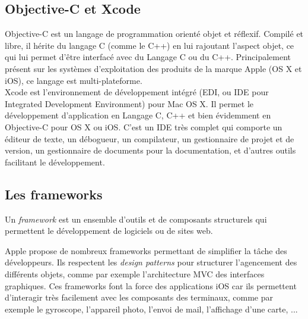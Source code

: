 
\subsection{Objective-C et Xcode}

Objective-C est un langage de programmation orienté objet et réflexif.
Compilé et libre, il hérite du langage C (comme le C++) en lui rajoutant l'aspect objet, ce qui lui permet d'être interfacé avec du Langage C ou du C++.
Principalement présent sur les systèmes d'exploitation des produits de la marque Apple (OS X et iOS), ce langage est multi-plateforme.
\\


Xcode est l'environnement de développement intégré (EDI, ou IDE pour Integrated Development Environment) pour Mac OS X.
Il permet le développement d'application en Langage C, C++ et bien évidemment en Objective-C pour OS X ou iOS.
C'est un IDE très complet qui comporte un éditeur de texte, un débogueur, un compilateur, un gestionnaire de projet et de version, un gestionnaire de documents pour la documentation, et d'autres outils facilitant le développement.




\subsection{Les frameworks}

Un \textit{framework} est un ensemble d'outils et de composants structurels qui permettent le développement de logiciels ou de sites web.

Apple propose de nombreux frameworks permettant de simplifier la tâche des développeurs.
Ils respectent les \textit{design patterns} pour structurer l'agencement des différents objets, comme par exemple l'architecture MVC des interfaces graphiques.
Ces frameworks font la force des applications iOS car ils permettent d'interagir très facilement avec les composants des terminaux, comme par exemple le gyroscope, l'appareil photo, l'envoi de mail, l'affichage d'une carte, ...
\\


